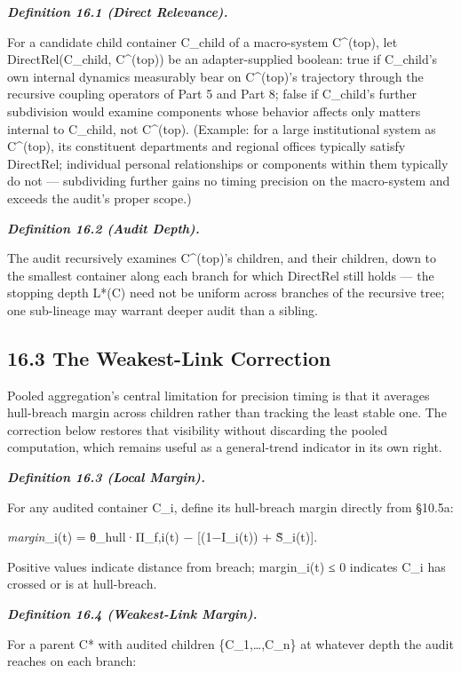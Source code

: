 \documentclass[
]{article}
\begin{document}
\emph{\textbf{Definition 16.1 (Direct Relevance).}}

For a candidate child container C\_child of a macro-system C\^{}(top),
let DirectRel(C\_child, C\^{}(top)) be an adapter-supplied boolean: true
if C\_child's own internal dynamics measurably bear on C\^{}(top)'s
trajectory through the recursive coupling operators of Part 5 and Part
8; false if C\_child's further subdivision would examine components
whose behavior affects only matters internal to C\_child, not
C\^{}(top). (Example: for a large institutional system as C\^{}(top),
its constituent departments and regional offices typically satisfy
DirectRel; individual personal relationships or components within them
typically do not --- subdividing further gains no timing precision on
the macro-system and exceeds the audit's proper scope.)

\emph{\textbf{Definition 16.2 (Audit Depth).}}

The audit recursively examines C\^{}(top)'s children, and their
children, down to the smallest container along each branch for which
DirectRel still holds --- the stopping depth L*(C) need not be uniform
across branches of the recursive tree; one sub-lineage may warrant
deeper audit than a sibling.

\hypertarget{the-weakest-link-correction}{%
\subsection{16.3 The Weakest-Link
Correction}\label{the-weakest-link-correction}}

Pooled aggregation's central limitation for precision timing is that it
averages hull-breach margin across children rather than tracking the
least stable one. The correction below restores that visibility without
discarding the pooled computation, which remains useful as a
general-trend indicator in its own right.

\emph{\textbf{Definition 16.3 (Local Margin).}}

For any audited container C\_i, define its hull-breach margin directly
from §10.5a:

\emph{margin}\_i(t) = θ\_hull·Π\_f,i(t) − {[}(1−I\_i(t)) + S̃\_i(t){]}.

Positive values indicate distance from breach; margin\_i(t) ≤ 0
indicates C\_i has crossed or is at hull-breach.

\emph{\textbf{Definition 16.4 (Weakest-Link Margin).}}

For a parent C* with audited children \{C\_1,\ldots,C\_n\} at whatever
depth the audit reaches on each branch:
\end{document}
